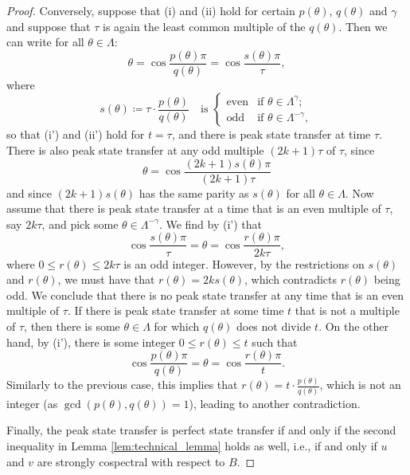 \documentclass{article}
\numberwithin{equation}{section}
\begin{document}
\begin{proof}
Conversely, suppose that (i) and (ii) hold for certain $p(\theta)$, $q(\theta)$ and $\gamma$ and suppose that $\tau$ is again the least common multiple of the $q(\theta)$. Then we can write for all $\theta \in \Lambda$:
\[
\theta = \cos\frac{p(\theta) \pi}{q(\theta)} = \cos\frac{s(\theta) \pi}{\tau},
\]
where
\[
s(\theta) \coloneq \tau \cdot \frac{p(\theta)}{q(\theta)} \quad \text{is }
\begin{cases}
\text{even} &\text{if $\theta \in \Lambda^{\gamma}$}; \\
\text{odd} &\text{if $\theta \in \Lambda^{-\gamma}$},
\end{cases}
\]
so that (i') and (ii') hold for $t = \tau$, and there is peak state transfer at time $\tau$. There is also peak state transfer at any odd multiple $(2k+1)\tau$ of $\tau$, since
\[
\theta = \cos\frac{(2k+1) s(\theta) \pi}{(2k+1)\tau}
\]
and since $(2k+1)s(\theta)$ has the same parity as $s(\theta)$ for all $\theta \in \Lambda$. Now assume that there is peak state transfer at a time that is an even multiple of $\tau$, say $2k\tau$, and pick some $\theta \in \Lambda^{-\gamma}$. We find by (i') that
\[
\cos\frac{s(\theta) \pi}{\tau} = \theta =  \cos\frac{r(\theta) \pi}{2k\tau},
\]
where $0 \leq r(\theta) \leq 2k\tau$ is an odd integer. However, by the restrictions on $s(\theta)$ and $r(\theta)$, we must have that $r(\theta) = 2ks(\theta)$, which contradicts $r(\theta)$ being odd. We conclude that there is no peak state transfer at any time that is an even multiple of $\tau$. If there is peak state transfer at some time $t$ that is not a multiple of $\tau$, then there is some $\theta \in \Lambda$ for which $q(\theta)$ does not divide $t$. On the other hand, by (i'), there is some integer $0 \leq r(\theta) \leq t$ such that
\[
\cos\frac{p(\theta)\pi}{q(\theta)} = \theta = \cos\frac{r(\theta)\pi}{t}.
\]
Similarly to the previous case, this implies that $r(\theta) = t\cdot \frac{p(\theta)}{q(\theta)}$, which is not an integer (as $\gcd(p(\theta),q(\theta)) = 1$), leading to another contradiction.

Finally, the peak state transfer is perfect state transfer if and only if the second inequality in Lemma \ref{lem:technical_lemma} holds as well, i.e., if and only if $u$ and $v$ are strongly cospectral with respect to $B$.
\end{proof}
\end{document}

